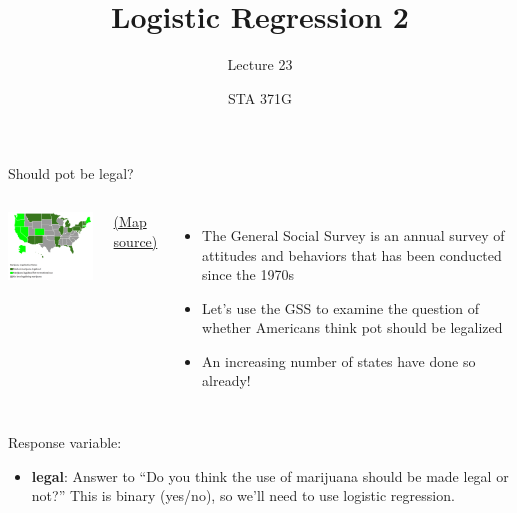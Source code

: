 \documentclass{beamer}\usepackage[]{graphicx}\usepackage[]{color}
\title{Logistic Regression 2}
\subtitle{Lecture 23}
\author{STA 371G}
\begin{document}
  
  

  \frame{\maketitle}



  \begin{darkframes}
    \begin{frame}{Should pot be legal?}
      \begin{columns}[onlytextwidth]
          \includegraphics[width=2in]{map}

          \begin{center}
            \fontsize{8}{8} 
            \href{http://www.governing.com/gov-data/state-marijuana-laws-map-medical-recreational.html}{(Map source)}
          \end{center}
        
          \begin{itemize}
            \item The General Social Survey is an annual survey of attitudes and behaviors that has been conducted since the 1970s
            \item Let's use the GSS to examine the question of whether Americans think pot should be legalized
            \item An increasing number of states have done so already!
          \end{itemize}
      \end{columns}
    \end{frame}

    \begin{frame}
      Response variable:
      \begin{itemize}
        \item \textbf{legal}: Answer to ``Do you think the use of marijuana should be made legal or not?'' \pause\alert{This is binary (yes/no), so we'll need to use logistic regression.}
      \end{itemize}


\end{frame}
\end{darkframes}
\end{document}
